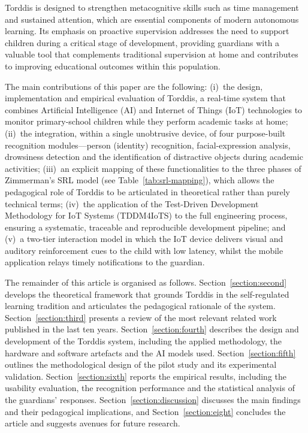 Torddis is designed to strengthen metacognitive skills such as time management and sustained attention, which are essential components of modern autonomous learning. Its emphasis on proactive supervision addresses the need to support children during a critical stage of development, providing guardians with a valuable tool that complements traditional supervision at home and contributes to improving educational outcomes within this population.

The main contributions of this paper are the following: (i)~the design, implementation and empirical evaluation of Torddis, a real-time system that combines Artificial Intelligence (AI) and Internet of Things (IoT) technologies to monitor primary-school children while they perform academic tasks at home; (ii)~the integration, within a single unobtrusive device, of four purpose-built recognition modules---person (identity) recognition, facial-expression analysis, drowsiness detection and the identification of distractive objects during academic activities; (iii)~an explicit mapping of these functionalities to the three phases of Zimmerman's SRL model (see Table~\ref{tab:srl-mapping}), which allows the pedagogical role of Torddis to be articulated in theoretical rather than purely technical terms; (iv)~the application of the Test-Driven Development Methodology for IoT Systems (TDDM4IoTS) to the full engineering process, ensuring a systematic, traceable and reproducible development pipeline; and (v)~a two-tier interaction model in which the IoT device delivers visual and auditory reinforcement cues to the child with low latency, whilst the mobile application relays timely notifications to the guardian.

The remainder of this article is organised as follows. Section~\ref{section:second} develops the theoretical framework that grounds Torddis in the self-regulated learning tradition and articulates the pedagogical rationale of the system.  Section~\ref{section:third} presents a review of the most relevant related work published in the last ten years. Section~\ref{section:fourth} describes the design and development of the Torddis system, including the applied methodology, the hardware and software artefacts and the AI models used. Section~\ref{section:fifth} outlines the methodological design of the pilot study and its experimental validation. Section~\ref{section:sixth} reports the empirical results, including the usability evaluation, the recognition performance and the statistical analysis of the guardians' responses. Section~\ref{section:discussion} discusses the main findings and their pedagogical implications, and Section~\ref{section:eight} concludes the article and suggests avenues for future research.

